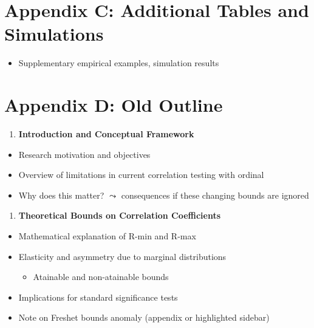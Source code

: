 \documentclass[
  12pt,
]{article}
\providecommand{\tightlist}{%
  \setlength{\itemsep}{0pt}\setlength{\parskip}{0pt}}
\theoremstyle{plain}
\theoremstyle{definition}
\theoremstyle{remark}
\begin{document}
\section{Appendix C: Additional Tables and
Simulations}\label{appendix-c-additional-tables-and-simulations}

\begin{itemize}
\tightlist
\item
  Supplementary empirical examples, simulation results
\end{itemize}

\section{Appendix D: Old Outline}\label{appendix-d-old-outline}

\begin{enumerate}
\def\labelenumi{\arabic{enumi}.}
\tightlist
\item
  \textbf{Introduction and Conceptual Framework}
\end{enumerate}

\begin{itemize}
\tightlist
\item
  Research motivation and objectives
\item
  Overview of limitations in current correlation testing with ordinal
\item
  Why does this matter? \(\leadsto\) consequences if these changing
  bounds are ignored
\end{itemize}

\begin{enumerate}
\def\labelenumi{\arabic{enumi}.}
\setcounter{enumi}{1}
\tightlist
\item
  \textbf{Theoretical Bounds on Correlation Coefficients}
\end{enumerate}

\begin{itemize}
\tightlist
\item
  Mathematical explanation of R-min and R-max
\item
  Elasticity and asymmetry due to marginal distributions

  \begin{itemize}
  \tightlist
  \item
    Atainable and non-atainable bounds
  \end{itemize}
\item
  Implications for standard significance tests
\item
  Note on Freshet bounds anomaly (appendix or highlighted sidebar)
\end{itemize}
\end{document}
